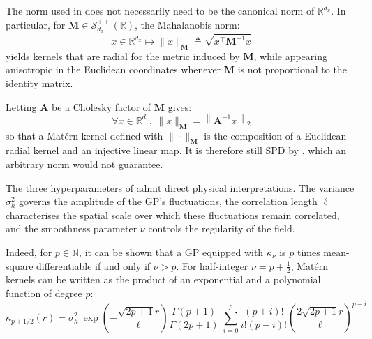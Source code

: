 \begin{remark}
	The norm used in  does not necessarily need to be the canonical norm of $\mathbb{R}^{d_x}$. In particular, for $\mathbf{M}\in\mathcal{S}_{d_x}^{++}(\mathbb{R})$, the Mahalanobis norm:
	\begin{equation}
		x\in\mathbb{R}^{d_x}\mapsto\|x\|_{\mathbf{M}}\triangleq\sqrt{x^\top \mathbf{M}^{-1}x}
	\end{equation}
	yields kernels that are radial for the metric induced by $\mathbf{M}$, while appearing anisotropic in the Euclidean coordinates whenever $\mathbf{M}$ is not proportional to the identity matrix.

	Letting $\mathbf{A}$ be a Cholesky factor of $\mathbf{M}$ gives:
	\begin{equation}
		\forall x\in\mathbb{R}^{d_x},\:\|x\|_{\mathbf{M}}=\left\|\mathbf{A}^{-1}x\right\|_2
	\end{equation}
	so that a Matérn kernel defined with $\|\cdot\|_{\mathbf{M}}$ is the composition of a Euclidean radial kernel and an injective linear map. It is therefore still SPD by , which an arbitrary norm would not guarantee.
\end{remark}

The three hyperparameters of  admit direct physical interpretations. The variance $\sigma_h^2$ governs the amplitude of the GP's fluctuations, the correlation length $\ell$ characterises the spatial scale over which these fluctuations remain correlated, and the smoothness parameter $\nu$ controls the regularity of the field.

Indeed, for $p\in\mathbb{N}$, it can be shown \cite{bib:Rasmussen-covariance} that a GP equipped with $\kappa_\nu$ is $p$ times mean-square differentiable if and only if $\nu>p$. For half-integer $\nu=p+\tfrac{1}{2}$, Matérn kernels can be written as the product of an exponential and a polynomial function of degree $p$:
\begin{equation}
	\kappa_{p+1/2}(r)=\sigma_h^2\:\exp\left(-\frac{\sqrt{2p+1}r}{\ell}\right)\frac{\Gamma(p+1)}{\Gamma(2p+1)}\:\sum_{i=0}^p\frac{(p+i)!}{i!(p-i)!}\left(\frac{2\sqrt{2p+1}r}{\ell}\right)^{p-i}
\end{equation}

